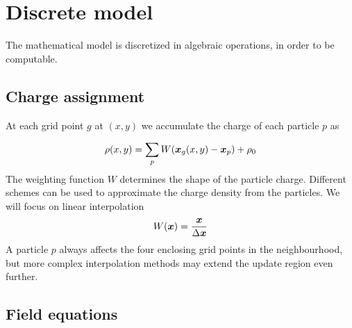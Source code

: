 \chapter{Discrete model}
\label{ch:discrete-model}

The mathematical model is discretized in algebraic operations, in order to be 
computable.

\section{Charge assignment}

At each grid point $g$ at $(x,y)$ we accumulate the charge of each particle $p$ 
as

\begin{equation}
\rho(x, y) = \sum_p W(\bm{x}_g(x, y) - \bm{x}_p) + \rho_0
\end{equation}
%
The weighting function $W$ determines the shape of the particle charge. 
Different schemes can be used to approximate the charge density from the 
particles. We will focus on linear interpolation
%
\begin{equation}
W(\bm{x}) = \frac{\bm{x}}{\Delta \bm{x}}
\end{equation}
%
A particle $p$ always affects the four enclosing grid points in the 
neighbourhood, but more complex interpolation methods may extend the update 
region even further.
%
\begin{center}
\end{center}
%
\section{Field equations}

